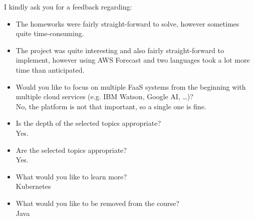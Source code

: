 I kindly ask you for a feedback regarding:
\begin{itemize}
    \item The homeworks were fairly straight-forward to solve, however sometimes quite time-consuming.

    \item The project was quite interesting and also fairly straight-forward to implement,
          however using AWS Forecast and two languages took a lot more time than anticipated.

    \item Would you like to focus on multiple FaaS systems from the beginning with multiple cloud services (e.g. IBM Watson, Google AI, …)? \\
          No, the platform is not that important, so a single one is fine.

    \item Is the depth of the selected topics appropriate? \\
          Yes.

    \item Are the selected topics appropriate? \\
          Yes.

    \item What would you like to learn more? \\
          Kubernetes

    \item What would you like to be removed from the course? \\
          Java
\end{itemize}
